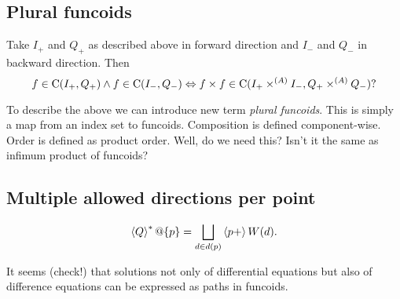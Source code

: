 \subsection{Plural funcoids}

Take $I_+$ and $Q_+$ as described above in forward direction and $I_-$ and $Q_-$ in backward direction. Then
\[ f\in\mathrm{C}(I_+,Q_+)\land f\in\mathrm{C}(I_-,Q_-) \Leftrightarrow f\times f\in\mathrm{C}(I_+\times^{(A)}I_-,Q_+\times^{(A)}Q_-)? \]

To describe the above we can introduce new term \emph{plural funcoids}. This is simply a map
from an index set to funcoids. Composition is defined component-wise. Order is defined as product order.
Well, do we need this? Isn't it the same as infimum product of funcoids?

\subsection{Multiple allowed directions per point}

\[ \rsupfun{Q}@\{p\} = \bigsqcup_{d\in d(p)} \supfun{p+} W(d). \]

It seems (check!) that solutions not only of differential equations but also of difference equations can be
expressed as paths in funcoids.